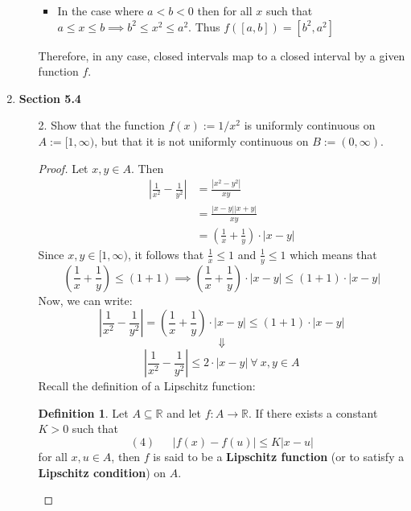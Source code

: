 \documentclass[12pt,letterpaper]{article}
\newcommand{\abs}[1]{\left\lvert #1 \right\rvert}
\newcommand{\R}{\mathbb{R}}
\theoremstyle{case}
\theoremstyle{definition}
\newtheorem{definition}{Definition}[section]
\begin{document}
\begin{enumerate}
\begin{enumerate}
\begin{itemize}
					\item In the case where $a < b < 0$ then for all $x$ such that $a \leq x \leq b \implies b^2 \leq x^2 \leq a^2$. Thus $f([a,b])=[b^2,a^2]$
				\end{itemize}
				Therefore, in any case, closed intervals map to a closed interval by a given function $f$.
			\end{enumerate}
			\item \textbf{Section 5.4}
			\begin{enumerate}
				\item[2.] Show that the function $f(x):= 1/x^2$ is uniformly continuous on $A:=[1, \infty)$, but that it is not uniformly continuous on $B:=(0,\infty)$.\\
				
				\begin{proof}
					Let $x,y \in A$. Then
					\begin{align*}
						\abs{\frac{1}{x^2}-\frac{1}{y^2}} &= \frac{|x^2-y^2|}{xy} \\
						&= \frac{|x-y||x+y|}{xy} \\
						&= \left(\frac{1}{x}+\frac{1}{y}\right) \cdot |x-y|
					\end{align*}
					Since $x,y \in [1, \infty)$, it follows that $\frac{1}{x} \leq 1$ and $\frac{1}{y} \leq 1$ which means that
					\[\left(\frac{1}{x}+\frac{1}{y}\right) \leq (1+1) \implies \left(\frac{1}{x}+\frac{1}{y}\right) \cdot |x-y| \leq (1+1) \cdot |x-y|\]
					Now, we can write:
					\[\abs{\frac{1}{x^2}-\frac{1}{y^2}}=\left(\frac{1}{x}+\frac{1}{y}\right) \cdot |x-y| \leq (1+1) \cdot |x-y|\]
					\[\Downarrow\]
					\[\abs{\frac{1}{x^2}-\frac{1}{y^2}} \leq 2 \cdot |x-y|\ \forall\ x,y \in A\]
					Recall the definition of a Lipschitz function:
					\theoremstyle{definition}
					\begin{definition}
						Let $A \subseteq \R$ and let $f:A \rightarrow \R$. If there exists a constant $K > 0$ such that 
						\[(4)\ \ \ \ \ \ \ |f(x)-f(u)| \leq K|x-u|\]
						for all $x,u \in A$, then $f$ is said to be a \textbf{Lipschitz function} (or to satisfy a \textbf{Lipschitz condition}) on $A$.\\
						

\end{definition}
\end{proof}
\end{enumerate}
\end{enumerate}
\end{document}
